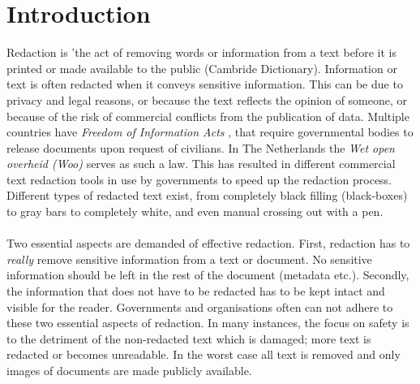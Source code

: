 \chapter{Introduction}

Redaction is 'the act of removing words or information from a text before it is printed or made available to the public (Cambride Dictionary). Information or text is often redacted when it conveys sensitive information. This can be due to privacy and legal reasons, or because the text reflects the opinion of someone, or because of the risk of commercial conflicts from the publication of data. %
Multiple countries have \textit{Freedom of Information Acts} \cite{USAFia}, that require governmental bodies to release documents upon request of civilians. In The Netherlands the \textit{Wet open overheid (Woo)} \cite{WooWebsite} serves as such a law. This has resulted in different commercial text redaction tools in use by governments to speed up the redaction process. Different types of redacted text exist, from completely black filling (black-boxes) to gray bars to completely white, and even manual crossing out with a pen. 
\\\\
Two essential aspects are demanded of effective redaction. First, redaction has to \textit{really} remove sensitive information from a text or document. No sensitive information should be left in the rest of the document (metadata etc.). Secondly, the information that does not have to be redacted has to be kept intact and visible for the reader. Governments and organisations often can not adhere to these two essential aspects of redaction. In many instances, the focus on safety is to the detriment of the non-redacted text which is damaged; more text is redacted or becomes unreadable. In the worst case all text is removed and only images of documents are made publicly available. 
